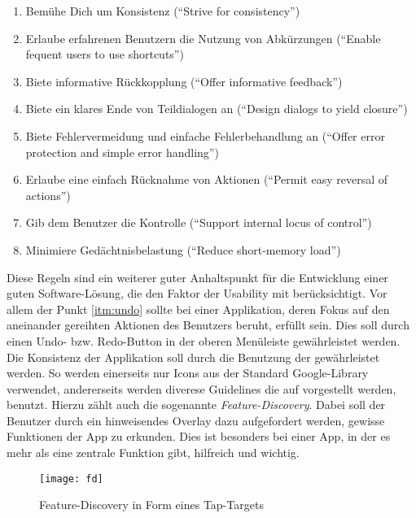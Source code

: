 \begin{enumerate}
  \item Bemühe Dich um Konsistenz (``Strive for consistency'')
  \item Erlaube erfahrenen Benutzern die Nutzung von Abkürzungen (``Enable fequent users to use shortcuts'')
  \item Biete informative Rückkopplung (``Offer informative feedback'')
  \item Biete ein klares Ende von Teildialogen an (``Design dialogs to yield closure'')
  \item Biete Fehlervermeidung und einfache Fehlerbehandlung an (``Offer error protection and simple error handling'')
  \item \label{itm:undo} Erlaube eine einfach Rücknahme von Aktionen (``Permit easy reversal of actions'')
  \item Gib dem Benutzer die Kontrolle (``Support internal locus of control'')
  \item Minimiere Gedächtnisbelastung (``Reduce short-memory load'')
\end{enumerate} 

Diese Regeln sind ein weiterer guter Anhaltspunkt für die Entwicklung einer guten Software-Lösung, die den Faktor der Usability mit berücksichtigt. Vor allem der Punkt \autoref{itm:undo} sollte bei einer Applikation, deren Fokus auf den aneinander gereihten Aktionen des Benutzers beruht, erfüllt sein. Dies soll durch einen Undo- bzw. Redo-Button in der oberen Menüleiste gewährleistet werden. \\

Die Konsistenz der Applikation soll durch die Benutzung der \citet{AndroidMG} gewährleistet werden. 
So werden einerseits nur Icons aus der Standard Google-Library verwendet, andererseits werden diverese Guidelines die auf \citet{AndroidMG} vorgestellt werden, benutzt. 
Hierzu zählt auch die sogenannte \emph{Feature-Discovery}.
Dabei soll der Benutzer durch ein hinweisendes Overlay dazu aufgefordert werden, gewisse Funktionen der App zu erkunden. 
Dies ist besonders bei einer App, in der es mehr als eine zentrale Funktion gibt, hilfreich und wichtig. \\

\begin{figure}[h]
  \centering
  \texttt{[image: fd]}
  \caption{Feature-Discovery in Form eines Tap-Targets}
  \label{fig:fd}
\end{figure}

